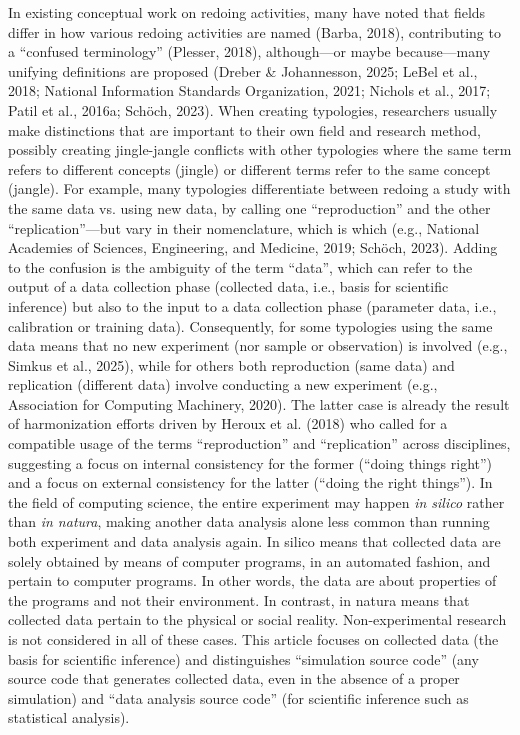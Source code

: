 \documentclass[authordate, meta]{jote-new-article}
\begin{document}
	In existing conceptual work on redoing activities, many have noted that fields differ in how various redoing activities are named (Barba, 2018), contributing to a “confused terminology” (Plesser, 2018), although—or maybe because—many unifying definitions are proposed (Dreber \& Johannesson, 2025; LeBel et al., 2018; National Information Standards Organization, 2021; Nichols et al., 2017; Patil et al., 2016a; Schöch, 2023). When creating typologies, researchers usually make distinctions that are important to their own field and research method, possibly creating jingle-jangle conflicts with other typologies where the same term refers to different concepts (jingle) or different terms refer to the same concept (jangle). For example, many typologies differentiate between redoing a study with the same data vs. using new data, by calling one “reproduction” and the other “replication”—but vary in their nomenclature, which is which (e.g., National Academies of Sciences, Engineering, and Medicine, 2019; Schöch, 2023). Adding to the confusion is the ambiguity of the term “data”, which can refer to the output of a data collection phase (collected data, i.e., basis for scientific inference) but also to the input to a data collection phase (parameter data, i.e., calibration or training data). Consequently, for some typologies using the same data means that no new experiment (nor sample or observation) is involved (e.g., Simkus et al., 2025), while for others both reproduction (same data) and replication (different data) involve conducting a new experiment (e.g., Association for Computing Machinery, 2020). The latter case is already the result of harmonization efforts driven by Heroux et al. (2018) who called for a compatible usage of the terms “reproduction” and “replication” across disciplines, suggesting a focus on internal consistency for the former (“doing things right”) and a focus on external consistency for the latter (“doing the right things”). In the field of computing science, the entire experiment may happen \emph{in silico} rather than \emph{in natura}, making another data analysis alone less common than running both experiment and data analysis again. In silico means that collected data are solely obtained by means of computer programs, in an automated fashion, and pertain to computer programs. In other words, the data are about properties of the programs and not their environment. In contrast, in natura means that collected data pertain to the physical or social reality. Non-experimental research is not considered in all of these cases. This article focuses on collected data (the basis for scientific inference) and distinguishes “simulation source code” (any source code that generates collected data, even in the absence of a proper simulation) and “data analysis source code” (for scientific inference such as statistical analysis).
\end{document}
